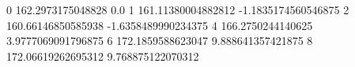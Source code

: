 0 162.2973175048828 0.0
1 161.11380004882812 -1.1835174560546875
2 160.66146850585938 -1.6358489990234375
4 166.2750244140625 3.9777069091796875
6 172.1859588623047 9.888641357421875
8 172.06619262695312 9.768875122070312
